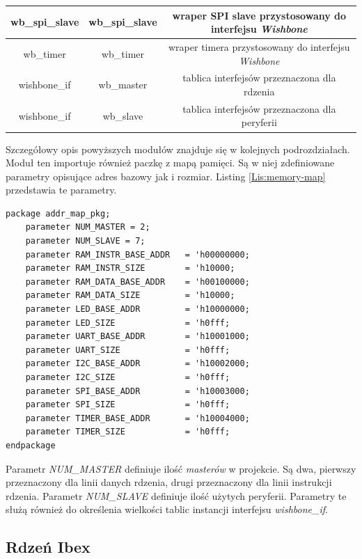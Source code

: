 \documentclass[11pt,a4paper]{article}
\begin{document}
\begin{minipage}{\textwidth}
\begin{center}
{\begin{tabular}{|c|c|c|}
					\hline	
					wb\_spi\_slave & wb\_spi\_slave & wraper SPI slave przystosowany do interfejsu \textit{Wishbone} \\
					\hline		
					wb\_timer & wb\_timer & wraper timera przystosowany do interfejsu \textit{Wishbone} \\
					\hline			
					wishbone\_if & wb\_master & tablica interfejsów przeznaczona dla rdzenia \\
					\hline		
					wishbone\_if & wb\_slave & tablica interfejsów przeznaczona dla peryferii \\
					\hline													
				\end{tabular}
				}
				\end{center}
				\end{minipage}
Szczegółowy opis powyższych modułów znajduje się w kolejnych podrozdziałach. 
Moduł ten importuje również paczkę z mapą pamięci. Są w niej zdefiniowane parametry opisujące adres bazowy jak i rozmiar. Listing \ref{Lis:memory-map} przedstawia te parametry.

\begin{minipage}{\textwidth}
\begin{scriptsize}
\begin{lstlisting}[label=Lis:memory-map,caption=Mapa pamięci]
package addr_map_pkg;
	parameter NUM_MASTER = 2;
	parameter NUM_SLAVE = 7;
	parameter RAM_INSTR_BASE_ADDR   = 'h00000000;
	parameter RAM_INSTR_SIZE        = 'h10000;
	parameter RAM_DATA_BASE_ADDR    = 'h00100000;
	parameter RAM_DATA_SIZE         = 'h10000;
	parameter LED_BASE_ADDR         = 'h10000000;
	parameter LED_SIZE              = 'h0fff;
	parameter UART_BASE_ADDR        = 'h10001000;
	parameter UART_SIZE             = 'h0fff;
	parameter I2C_BASE_ADDR         = 'h10002000;
	parameter I2C_SIZE              = 'h0fff;
	parameter SPI_BASE_ADDR         = 'h10003000;
	parameter SPI_SIZE              = 'h0fff;
	parameter TIMER_BASE_ADDR       = 'h10004000;
	parameter TIMER_SIZE            = 'h0fff;
endpackage
\end{lstlisting}
\end{scriptsize}
\end{minipage}
Parametr \textit{NUM\_MASTER} definiuje ilość \textit{masterów} w projekcie. Są dwa, pierwszy przeznaczony dla linii danych rdzenia, drugi przeznaczony dla linii instrukcji rdzenia. Parametr \textit{NUM\_SLAVE} definiuje ilość użytych peryferii. Parametry te służą również do określenia wielkości tablic instancji interfejsu \textit{wishbone\_if}.
	\subsection{Rdzeń Ibex}
\end{document}
